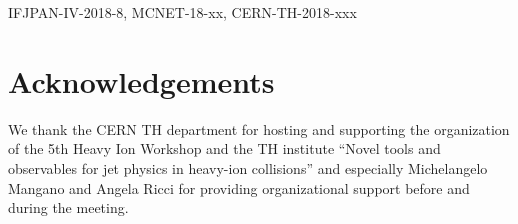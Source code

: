 \documentclass{article}
\begin{document}
\begin{flushright}
IFJPAN-IV-2018-8, MCNET-18-xx, CERN-TH-2018-xxx
\end{flushright}
%






\section*{Acknowledgements} 
We thank the CERN TH department for hosting and supporting the organization of the 5th Heavy Ion Workshop and the TH institute ``Novel tools and observables for jet physics in heavy-ion collisions'' and especially Michelangelo Mangano and Angela Ricci for providing organizational support before and during the meeting.

\appendix




\end{document}
